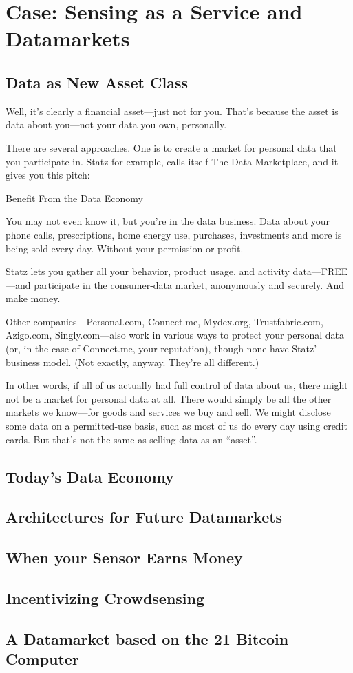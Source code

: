 \chapter{Case: Sensing as a Service and Datamarkets}
\label{sec:datamarket}

\section{Data as New Asset Class}

Well, it's clearly a financial asset—just not for you. That's because the asset is data about you—not your data you own, personally.

There are several approaches. One is to create a market for personal data that you participate in. Statz  for example, calls itself The Data Marketplace, and it gives you this pitch:

Benefit From the Data Economy

You may not even know it, but you're in the data business. Data about your phone calls, prescriptions, home energy use, purchases, investments and more is being sold every day. Without your permission or profit.

Statz lets you gather all your behavior, product usage, and activity data—FREE—and participate in the consumer-data market, anonymously and securely. And make money.

Other companies—Personal.com, Connect.me, Mydex.org, Trustfabric.com, Azigo.com, Singly.com—also work in various ways to protect your personal data (or, in the case of Connect.me, your reputation), though none have Statz' business model. (Not exactly, anyway. They're all different.)

In other words, if all of us actually had full control of data about us, there might not be a market for personal data at all. There would simply be all the other markets we know—for goods and services we buy and sell. We might disclose some data on a permitted-use basis, such as most of us do every day using credit cards. But that's not the same as selling data as an “asset”.

\cite{Searls:2012:EPD:2132860.2132869}

\section{Today's Data Economy}

\section{Architectures for Future Datamarkets}

\section{When your Sensor Earns Money}

\section{Incentivizing Crowdsensing}

\section{A Datamarket based on the 21 Bitcoin Computer}
